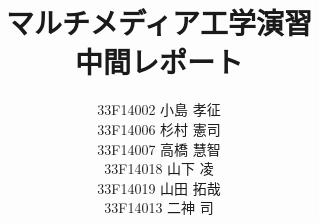 \documentclass[a4j]{jreport}
\begin{document}
\title{マルチメディア工学演習\\中間レポート}
\author{
  33F14002 小島 孝征\\
  33F14006 杉村 憲司\\
  33F14007 高橋 慧智\\
  33F14018 山下 凌\\
  33F14019 山田 拓哉\\
  33F14013 二神 司 
}

\maketitle

\tableofcontents













\end{document}
